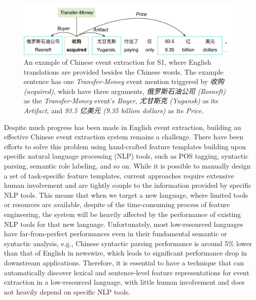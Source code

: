 \begin{figure}
\centering
\includegraphics[width=.9\textwidth]{example.pdf}
\caption{An example of Chinese event extraction for S1, where English translations are provided besides the Chinese words. The example sentence has one \emph{Transfer-Money} event mention triggered by \textit{收购 (acquired)}, which have three arguments, \textit{俄罗斯石油公司 (Rosneft)} as the \emph{Transfer-Money} event's \textit{Buyer}, \textit{尤甘斯克 (Yugansk)}  as its \textit{Artifact}, and \textit{93.5 亿美元 (9.35 billion dollars)} as its \textit{Price}.}
\label{exfigure}
\end{figure}


Despite much progress has been made in English event extraction, building an effective Chinese event extraction system remains a challenge.
There have been efforts to solve this problem using hand-crafted feature templates building upon specific natural language processing (NLP)
tools, such as POS tagging\FIXME{~\cite{}}, syntactic parsing\FIXME{~\cite{}}, semantic role labeling\FIXME{~\cite{}}, and so on. While it
is possible to manually design a set of task-specific feature templates, current approaches require extensive human involvement and are
tightly couple to the information provided by specific NLP tools. This means that when we target a new  language,  where limited tools or
resources are available, despite of the time-consuming process of feature engineering, the system will be heavily affected by the
performance of existing NLP tools for that new language. Unfortunately, most low-resourced languages have far-from-perfect performances
even in their fundamental semantic or syntactic analysis, e.g., Chinese syntactic parsing performance is around 5\% lower than that of
English in newswire, which leads to significant performance drop in downstream applications. Therefore, it is essential to have a technique
that can automatically discover lexical and sentence-level feature representations for event extraction in a low-resourced language, with
little human involvement and does not heavily depend on specific NLP tools.

